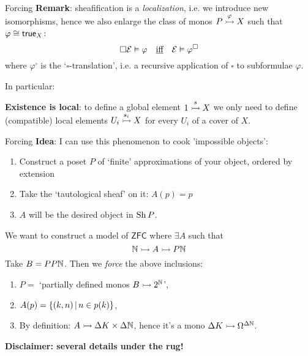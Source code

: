 \begin{frame}{Forcing}
	\textbf{Remark}: sheafification is a \emph{localization}, i.e. we introduce new isomorphisms, hence we also enlarge the class of monos $P \overset{\varphi}{\rightarrowtail} X$ such that $\varphi \overset{}{\cong} \mathsf{true}_X$:
	\begin{equation*}
		\square \mathcal{E} \vDash \varphi \quad\text{\underline{iff}}\quad \mathcal{E} \vDash \varphi^\square
	\end{equation*}
	where $\varphi^\square$ is the `$\square$-translation', i.e. a recursive application of $\square$ to subformulae $\varphi$.

	In particular:
	\begin{center}%
		\textbf{Existence is local}: to define a global element $1 \overset{s}{\rightarrowtail} X$ we only need to define (compatible) local elements $U_i \overset{s_i}{\rightarrowtail} X$ for every $U_i$ of a cover of $X$.
	\end{center}
\end{frame}

\begin{frame}{Forcing}
	\textbf{Idea}: I can use this phenomenon to cook 'impossible objects':
	\begin{enumerate}
		\item Construct a poset $P$ of `finite' approximations of your object, ordered by extension
		\item Take the `tautological sheaf' on it: $A(p) = p$
		\item $A$ will be the desired object in $\operatorname{Sh} P$.
	\end{enumerate}
	\begin{example}
		We want to construct a model of $\mathsf{ZFC}$ where $\exists A$ such that
		\begin{equation*}
			\mathbb{N} \rightarrowtail A \rightarrowtail P\mathbb{N}
		\end{equation*}
		Take $B = PP\mathbb{N}$. Then we \emph{force} the above inclusions:
		\begin{enumerate}
			\item $P = $ `partially defined monos $B \rightarrowtail 2^{\mathbb{N}}$',
			\item $A(p) = \{(k, n) \,|\, n \in p(k)\}$,
			\item By definition: $A \rightarrowtail \Delta K \times \Delta \mathbb{N}$, hence it's a mono $\Delta K \rightarrowtail \Omega^{\Delta \mathbb{N}}$.
		\end{enumerate}
		{\bfseries\color{colornote}Disclaimer: several details under the rug!}
	\end{example}
\end{frame}

